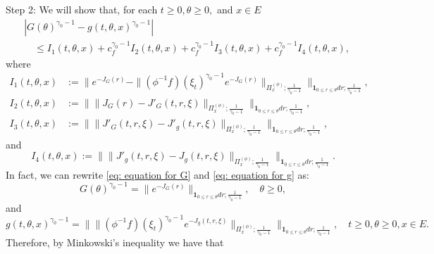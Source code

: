 \documentclass[12pt, a4paper]{amsart}
\theoremstyle{definition}
\numberwithin{equation}{section}
\begin{document}
	Step 2: We will show that, for each $t\geq 0, \theta \geq 0,$ and $x\in E$
\begin{equation}\begin{split}
	&|  G(\theta)^{\gamma_0 - 1} - g(t,\theta,x)^{\gamma_0 - 1} |
	\\&\quad \leq I_1(t,\theta,x) +c^{\gamma_0 - 1}_f I_2(t,\theta,x) 
	+c^{\gamma_0 - 1}_f I_3(t,\theta,x) + c^{\gamma_0 - 1}_f I_4(t,\theta,x),
\end{split}\end{equation}
	where
\begin{equation}
\begin{split}
	I_1(t,\theta,x)
	&:= \Big\| e^{ - J_G(r)} - \| (\phi^{-1}f)(\xi_t)^{\gamma_0 - 1} e^{-J_G(r)} \|_{\Pi_x^{(\phi)};\frac{1}{\gamma_0 - 1}} \Big\|_{\mathbf 1_{0\leq r\leq \theta} dr;\frac{1}{\gamma_0 - 1}} ,
	\\I_2(t,\theta,x)
	&:= \Big\|  \|  J_G(r) - J'_G(t,r,\xi)  \|_{\Pi_x^{(\phi)};\frac{1}{\gamma_0 - 1}} \Big\|_{\mathbf 1_{0\leq r\leq \theta} dr;\frac{1}{\gamma_0 - 1}},
	\\I_3(t,\theta,x)
	&:= \Big\| \|  J'_G(t,r,\xi) - J'_g(t,r,\xi)  \|_{\Pi_x^{(\phi)};\frac{1}{\gamma_0 - 1}} \Big\|_{\mathbf 1_{0\leq r\leq \theta} dr;\frac{1}{\gamma_0 - 1}},
\end{split}
\end{equation}
	and
\begin{equation}
	I_4(t,\theta,x)
	:= \Big\| \| J'_g(t,r,\xi) - J_g(t,r,\xi)  \|_{\Pi_x^{(\phi)};\frac{1}{\gamma_0 - 1}} \Big\|_{\mathbf 1_{0\leq r\leq \theta} dr;\frac{1}{\gamma_0 - 1}}.
\end{equation}
	In fact, we can rewrite \eqref{eq: equation for G} and \eqref{eq: equation for g} as:
\begin{equation}
	G(\theta)^{\gamma_0 - 1} =
	\| e^{ - J_G(r)} \|_{\mathbf 1_{0\leq r\leq \theta} dr;\frac{1}{\gamma_0 - 1}},
	\quad \theta \geq 0,
\end{equation}	
	and
\begin{equation}
	g(t,\theta,x)^{\gamma_0 - 1}
	=\Big\| \| (\phi^{-1}f)(\xi_t) ^{\gamma_0 - 1} e^{-J_g(t,r,\xi)} \|_{\Pi_x^{(\phi)};\frac{1}{\gamma_0 - 1}} \Big\|_{\mathbf 1_{0\leq r\leq \theta} dr;\frac{1}{\gamma_0 - 1}},
	\quad t\geq 0, \theta \geq 0, x\in E.
\end{equation}	
	Therefore, by Minkowski's inequality we have that
\end{document}
